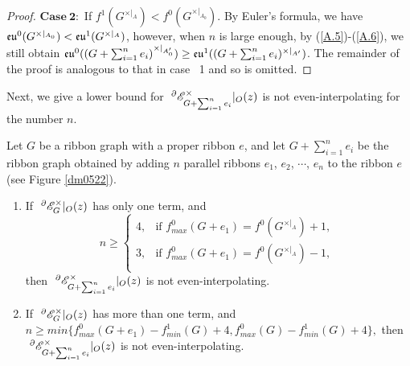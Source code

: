 \begin{proof}
$\mathbf{Case~ 2}:$ {If $f^{1}(G^{\times|_{A}})< f^{0}(G^{\times|_{A_{0}}}) $. By Euler's formula, we have ${\mathfrak{eu}}^{0}(G^{\times|_{A_{0}}})<{\mathfrak{eu}}^{1}(G^{\times|_{A}})$,
however, when $n$ is large enough, by (\ref{A.5})-(\ref{A.6}), we still obtain ${\mathfrak{eu}}^{0}((G+\sum ^{n}_{i=1}e_{i})^{\times|_{A'_{0}}}) \geq {\mathfrak{eu}}^{1}((G+\sum ^{n}_{i=1}e_{i})^{\times|_{A'}})$.
 The remainder of the proof is analogous to that in case~ 1 and so is omitted.}

\end{proof}


 Next, we give a   lower bound for    $~^{\partial}{{\mathscr{E}}}^{\times}_{G+\sum ^{n}_{i=1}e_{i}}|_O(z)$  is not  even-interpolating for the number $n$.
\begin{thm}\label{tm}
Let $G$ be a ribbon graph with a  proper ribbon $e$, and let $G+\sum ^{n}_{i=1}e_{i}$ be the ribbon graph obtained by adding $n$ parallel ribbons $e_1$, $e_2$, $\cdots$,  $e_n$ to the ribbon $e$ (see Figure \ref{dm0522}).
\begin{enumerate}
 \item If $~^{\partial}{{\mathscr{E}}}^{\times}_{G}|_O(z)$ has only one term, and \begin{equation*}
n\geq
\begin{cases}
 4,&\text{if $f^{0}_{max}(G +e_{1})= f^{0}(G^{\times|_{A}})+1$,  }\\
 3,&\text{if $f^{0}_{max}(G +e_{1})= f^{0}(G^{\times|_{A}})-1$,}\\

\end{cases}
\end{equation*} then  $~^{\partial}{{\mathscr{E}}}^{\times}_{G+\sum ^{n}_{i=1}e_{i}}|_O(z)$  is not  even-interpolating.
\item
    If $~^{\partial}{{\mathscr{E}}}^{\times}_{G}|_O(z)$ has more than one term, and $
    n\geq min\{f^{0}_{max}(G +e_{1})- f^{1}_{min}(G)+4, f^{0}_{max}(G)-f^{1}_{min}(G)+4\},
   $
     then $~^{\partial}{{\mathscr{E}}}^{\times}_{G+\sum ^{n}_{i=1}e_{i}}|_O(z)$  is not  even-interpolating.


\end{enumerate}

\end{thm}
